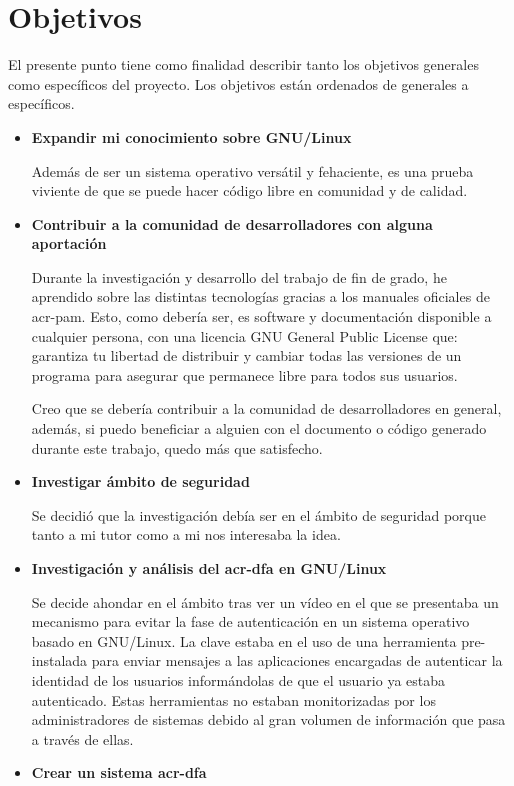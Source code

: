 \documentclass[twoside, titlepage, 12pt, a4paper]{article}
\let\oldsection\section
\def\section{\cleardoublepage\oldsection}
\begin{document}
\section{Objetivos}
El presente punto tiene como finalidad describir tanto los objetivos generales como específicos del proyecto. Los objetivos están ordenados de generales a específicos.
\begin{itemize}
	\item{\textbf{Expandir mi conocimiento sobre \gls{GNU/Linux}}}\par
		Además de ser un sistema operativo versátil y fehaciente, es una prueba viviente de que se puede hacer código libre en comunidad y de calidad.
	\item{\textbf{Contribuir a la comunidad de desarrolladores con alguna aportación}}\par
		Durante la investigación y desarrollo del trabajo de fin de grado, he aprendido sobre las distintas tecnologías gracias a los manuales oficiales de \gls{acr-pam}. Esto, como debería ser, es software y documentación disponible a cualquier persona, con una licencia GNU General Public License que: garantiza tu libertad de distribuir y cambiar todas las versiones de un programa para asegurar que permanece libre para todos sus usuarios. \cite{GNU-GPL} \par
		Creo que se debería contribuir a la comunidad de desarrolladores en general, además, si puedo beneficiar a alguien con el documento o código generado durante este trabajo, quedo más que satisfecho.
	\item{\textbf{Investigar ámbito de seguridad}}\par
		Se decidió que la investigación debía ser en el ámbito de seguridad porque tanto a mi tutor como a mi nos interesaba la idea.
	\item{\textbf{Investigación y análisis del \gls{acr-dfa} en \gls{GNU/Linux}}}\par
		Se decide ahondar en el ámbito tras ver un vídeo en el que se presentaba un mecanismo para evitar la fase de autenticación en un sistema operativo basado en \gls{GNU/Linux}. La clave estaba en el uso de una herramienta pre-instalada para enviar mensajes a las aplicaciones encargadas de autenticar la identidad de los usuarios informándolas de que el usuario ya estaba autenticado. Estas herramientas no estaban monitorizadas por los administradores de sistemas debido al gran volumen de información que pasa a través de ellas.
	\item{\textbf{Crear un sistema \gls{acr-dfa}}}\par

\end{itemize}
\end{document}
